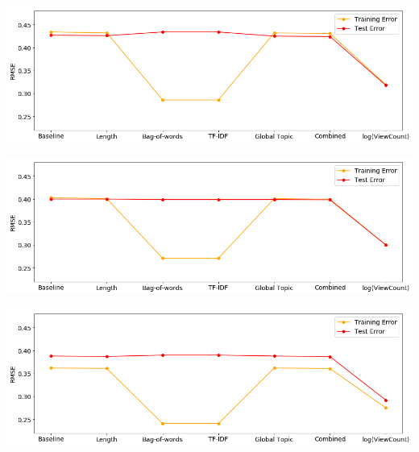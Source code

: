\documentclass[11pt,preprint, authoryear]{article}
\let\origfigure\figure
\let\endorigfigure\endfigure
\renewenvironment{figure}[1][2] {
    \expandafter\origfigure\expandafter[H]
} {
    \endorigfigure
}
\begin{document}
\normalsize

\footnotesize

\begin{figure}
\caption{\textbf{Model Training and Test RMSEs for June 2009}}
\label{fig:jun_res}

\includegraphics[width=1\linewidth]{../../01-python-code/00-workspace/01-eda/01-graphs/Jun-09-rmse-results} 
\end{figure}

\normalsize

\footnotesize

\begin{figure}
\caption{\textbf{Model Training and Test RMSEs for July 2009}}
\label{fig:jul_res}

\includegraphics[width=1\linewidth]{../../01-python-code/00-workspace/01-eda/01-graphs/Jul-09-rmse-results} 
\end{figure}

\normalsize

\footnotesize

\begin{figure}
\caption{\textbf{Model Training and Test RMSEs for August 2009}}
\label{fig:aug_res}

\includegraphics[width=1\linewidth]{../../01-python-code/00-workspace/01-eda/01-graphs/Aug-09-rmse-results} 
\end{figure}
\end{document}
